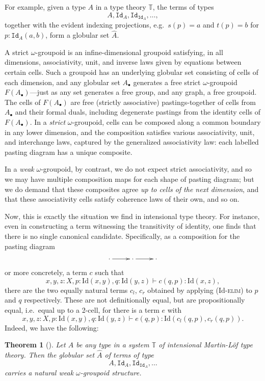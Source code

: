 \documentclass[reqno,12pt]{amsart}
\newcommand{\T}{\ensuremath{\mathbb{T}}}
\newcommand{\A}{A_\bullet}
\newcommand{\elim}{\textsc{elim}}
\newcommand{\Id}{\mathrm{Id}}
\newcommand{\types}{\vdash}
\newcommand{\id}[1]{\texttt{Id}_{#1}}
\newtheorem{theorem}{Theorem}[section]
\theoremstyle{definition}
\theoremstyle{remark}
\begin{document}
For example, given a type $A$ in a type theory $\T$, the terms of types $$A, \id{A}, \id{{\id{A}}}, \dots,$$ together with the evident indexing projections, e.g.\  $s(p) = a$ and $t(p) = b$ for $p:\id{A}(a,b)$, form a globular set $\hat{A}$.

A strict $\omega$-groupoid is an infine-dimensional groupoid satisfying, in all dimensions, associativity, unit, and inverse laws given by equations between certain cells.   Such a groupoid has an underlying globular set consisting of cells of each dimension, and any globular set $\A$ generates a free strict $\omega$-groupoid $F(\A)$---just as any set generates a free group, and any graph, a free groupoid.  The cells of $F(\A)$ are free (strictly associative) pastings-together of cells from $\A$ and their formal duals, including degenerate pastings from the identity cells of $F(\A)$.  In a \emph{strict} $\omega$-groupoid, cells can be composed along a common boundary in any lower dimension, and the composition satisfies various associativity, unit, and interchange laws, captured by the generalized associativity law: each labelled pasting diagram has a unique composite.

In a \emph{weak} $\omega$-groupoid, by contrast, we do not expect strict associativity, and so we may have multiple composition maps for each shape of pasting diagram; but we do demand that these composites agree \emph{up to cells of the next dimension}, and that these associativity cells satisfy coherence laws of their own, and so on.

Now, this is exactly the situation we find in intensional type theory.  For instance, even in constructing a term witnessing the transitivity of identity, one finds that there is no single canonical candidate.  Specifically, as a composition for the pasting diagram
$$ \xymatrix{ \cdot \ar[r] & \cdot \ar[r] & \cdot }$$
or more concretely, a term $c$ such that 
$$x,y,z:X, p:\Id(x,y), q:\Id(y,z) \types c(q,p): \Id(x,z),$$
there are the two equally natural terms $c_l$, $c_r$ obtained by applying ($\Id$-\elim) to $p$ and $q$ respectively.  These are not definitionally equal, but are propositionally equal, i.e.\ equal up to a 2-cell, for there is a term $e$ with
$$x,y,z:X, p:\Id(x,y), q:\Id(y,z) \types e(q,p): \Id(c_l(q,p),c_r(q,p)).$$
Indeed, we have the following:


\begin{theorem}[\cite{Lumsdaine:WOITT,Berg:TWOG}]  Let $A$ be any type in a system  $\T$ of intensional Martin-L\"of type theory.  Then the globular set $\hat{A}$ of terms of type $$A, \id{A}, \id{\id{A}}, \ldots$$ carries a natural weak $\omega$-groupoid structure.
\end{theorem}
\end{document}
